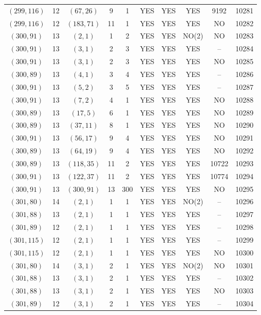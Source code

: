 \begin{longtable}{|c|c|c|c|c|c|c|c|c|c|}
$(299, 116)$ & 12 & $(67, 26)$ & 9 & 1 & YES & YES & YES & 9192 & 10281\\
$(299, 116)$ & 12 & $(183, 71)$ & 11 & 1 & YES & YES & YES & NO & 10282\\
$(300, 91)$ & 13 & $(2, 1)$ & 1 & 2 & YES & YES & NO(2) & NO & 10283\\
$(300, 91)$ & 13 & $(3, 1)$ & 2 & 3 & YES & YES & YES & -- & 10284\\
$(300, 91)$ & 13 & $(3, 1)$ & 2 & 3 & YES & YES & YES & NO & 10285\\
$(300, 89)$ & 13 & $(4, 1)$ & 3 & 4 & YES & YES & YES & -- & 10286\\
$(300, 91)$ & 13 & $(5, 2)$ & 3 & 5 & YES & YES & YES & -- & 10287\\
$(300, 91)$ & 13 & $(7, 2)$ & 4 & 1 & YES & YES & YES & NO & 10288\\
$(300, 89)$ & 13 & $(17, 5)$ & 6 & 1 & YES & YES & YES & NO & 10289\\
$(300, 89)$ & 13 & $(37, 11)$ & 8 & 1 & YES & YES & YES & NO & 10290\\
$(300, 91)$ & 13 & $(56, 17)$ & 9 & 4 & YES & YES & YES & NO & 10291\\
$(300, 89)$ & 13 & $(64, 19)$ & 9 & 4 & YES & YES & YES & NO & 10292\\
$(300, 89)$ & 13 & $(118, 35)$ & 11 & 2 & YES & YES & YES & 10722 & 10293\\
$(300, 91)$ & 13 & $(122, 37)$ & 11 & 2 & YES & YES & YES & 10774 & 10294\\
$(300, 91)$ & 13 & $(300, 91)$ & 13 & 300 & YES & YES & YES & NO & 10295\\
$(301, 80)$ & 14 & $(2, 1)$ & 1 & 1 & YES & YES & NO(2) & -- & 10296\\
$(301, 88)$ & 13 & $(2, 1)$ & 1 & 1 & YES & YES & YES & -- & 10297\\
$(301, 89)$ & 12 & $(2, 1)$ & 1 & 1 & YES & YES & YES & -- & 10298\\
$(301, 115)$ & 12 & $(2, 1)$ & 1 & 1 & YES & YES & YES & -- & 10299\\
$(301, 115)$ & 12 & $(2, 1)$ & 1 & 1 & YES & YES & YES & NO & 10300\\
$(301, 80)$ & 14 & $(3, 1)$ & 2 & 1 & YES & YES & NO(2) & NO & 10301\\
$(301, 88)$ & 13 & $(3, 1)$ & 2 & 1 & YES & YES & YES & -- & 10302\\
$(301, 88)$ & 13 & $(3, 1)$ & 2 & 1 & YES & YES & YES & NO & 10303\\
$(301, 89)$ & 12 & $(3, 1)$ & 2 & 1 & YES & YES & YES & -- & 10304\\

\end{longtable}
